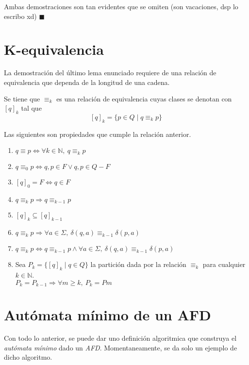 Ambas demostraciones son tan evidentes que se omiten (son vacaciones, dsp lo escribo xd) $\blacksquare$

\section{K-equivalencia}
La demostración del último lema enunciado requiere de una relación de equivalencia que dependa de la longitud de una cadena.


Se tiene que $\equiv_k$ es una relación de equivalencia cuyas clases se denotan con $[q]_k$ tal que
\[[q]_k = \{p \in Q \mid q \equiv_k p\}\]

Las siguientes son propiedades que cumple la relación anterior.

\begin{enumerate}
  \item $q \equiv p \Longleftrightarrow \forall k \in \mathbb N,~ q \equiv_k p$
  \item $q \equiv_0 p \Longleftrightarrow q, p \in F \lor q,p \in Q - F$
  \item $[q]_0 = F \Longleftrightarrow q \in F$
  \item $q \equiv_k p \Longrightarrow q \equiv_{k-1} p$
  \item $[q]_k \subseteq [q]_{k-1}$
  \item $q \equiv_k p \Longrightarrow \forall a \in \Sigma,~ \delta(q,a) \equiv_{k-1}\delta(p,a)$
  \item $q \equiv_k p \Longleftrightarrow q \equiv_{k-1} p \land \forall a \in \Sigma,~ \delta(q,a) \equiv_{k-1} \delta(p,a)$
  \item Sea $P_k = \{[q]_k \mid q \in Q\}$ la partición dada por la relación $\equiv_k$ para cualquier $k \in \mathbb N$. \\$P_k = P_{k-1} \Longrightarrow \forall m \ge k,~ P_k = Pm $
\end{enumerate}

\section{Autómata mínimo de un AFD}
Con todo lo anterior, se puede dar uno definición algoritmica que construya el \textit{autómata mínimo} dado un \textit{AFD}. Momentaneamente, se da solo un ejemplo de dicho algoritmo.


